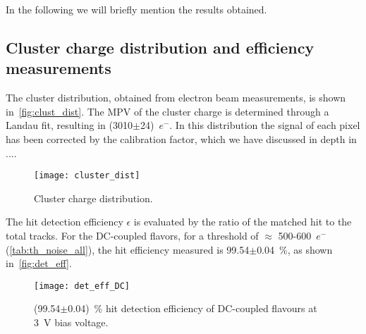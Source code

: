 In the following we will briefly mention the results obtained.


\subsection{Cluster charge distribution and efficiency measurements}

The cluster distribution, obtained from electron beam measurements, is shown in~\autoref{fig:clust_dist}. The MPV of the cluster charge is determined through a Landau fit, resulting in (3010$\pm$24)~$e^{-}$. In this distribution the signal of each pixel has been corrected by the calibration factor, which we have discussed in depth in ....

\begin{figure}
\centering
\texttt{[image: cluster\_dist]}
\caption{Cluster charge distribution.}
\label{fig:clust_dist}
\end{figure}


The hit detection efficiency $\epsilon$ is evaluated by the ratio of the matched hit to the total tracks. For the DC-coupled flavors, for a threshold of $\approx$  500-600~$e^{-}$ (\autoref{tab:th_noise_all}), the hit efficiency measured is 99.54$\pm$0.04~\%, as shown in~\autoref{fig:det_eff}.

\begin{figure}
\centering
\texttt{[image: det\_eff\_DC]}
\caption{(99.54$\pm$0.04)~\% hit detection efficiency of DC-coupled flavours at \SI{3}{V} bias voltage.}
\label{fig:det_eff}
\end{figure}











